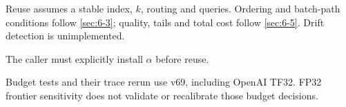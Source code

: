 Reuse assumes a stable index, $k$, routing and queries. Ordering and batch-path conditions follow \cref{sec:6-3}; quality, tails and total cost follow \cref{sec:6-5}. Drift detection is unimplemented.

The caller must explicitly install $\alpha$ before reuse.

Budget tests and their trace rerun use v69, including OpenAI TF32. FP32 frontier sensitivity does not validate or recalibrate those budget decisions.